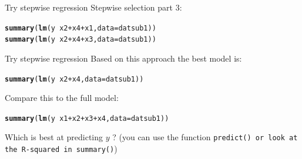 \documentclass[10pt]{beamer}\usepackage[]{graphicx}\usepackage[]{color}
\makeatletter
\newcommand{\hlopt}[1]{\textcolor[rgb]{0,0,0}{#1}}%
\newcommand{\hlstd}[1]{\textcolor[rgb]{0.345,0.345,0.345}{#1}}%
\newcommand{\hlkwc}[1]{\textcolor[rgb]{0.333,0.667,0.333}{#1}}%
\newcommand{\hlkwd}[1]{\textcolor[rgb]{0.737,0.353,0.396}{\textbf{#1}}}%
\newenvironment{kframe}{%
 \def\at@end@of@kframe{}%
 \ifinner\ifhmode%
  \def\at@end@of@kframe{\end{minipage}}%
  \begin{minipage}{\columnwidth}%
 \fi\fi%
 \def\FrameCommand##1{\hskip\@totalleftmargin \hskip-\fboxsep
 \colorbox{shadecolor}{##1}\hskip-\fboxsep
     \hskip-\linewidth \hskip-\@totalleftmargin \hskip\columnwidth}%
 \MakeFramed {\advance\hsize-\width
   \@totalleftmargin\z@ \linewidth\hsize
   \@setminipage}}%
 {\par\unskip\endMakeFramed%
 \at@end@of@kframe}
\newenvironment{knitrout}{}{} %
\makeatother
\begin{document}
\begin{frame}[fragile]{Try stepwise regression}
\pause
Stepwise selection part 3: \vspace{-0.1cm}
\begin{knitrout}\small
{}\color{fgcolor}\begin{kframe}
\begin{alltt}
\hlkwd{summary}\hlstd{(}\hlkwd{lm}\hlstd{(y} \hlopt{~} \hlstd{x2} \hlopt{+} \hlstd{x4} \hlopt{+} \hlstd{x1,} \hlkwc{data} \hlstd{= datsub1))}
\hlkwd{summary}\hlstd{(}\hlkwd{lm}\hlstd{(y} \hlopt{~} \hlstd{x2} \hlopt{+} \hlstd{x4} \hlopt{+} \hlstd{x3,} \hlkwc{data} \hlstd{= datsub1))}
\end{alltt}
\end{kframe}
\end{knitrout}


\end{frame}


\begin{frame}[fragile]{Try stepwise regression}
Based on this approach the best model is:
\begin{knitrout}\small
{}\color{fgcolor}\begin{kframe}
\begin{alltt}
\hlkwd{summary}\hlstd{(}\hlkwd{lm}\hlstd{(y} \hlopt{~} \hlstd{x2} \hlopt{+} \hlstd{x4,} \hlkwc{data} \hlstd{= datsub1))}
\end{alltt}
\end{kframe}
\end{knitrout}

Compare this to the full model:
\begin{knitrout}\small
{}\color{fgcolor}\begin{kframe}
\begin{alltt}
\hlkwd{summary}\hlstd{(}\hlkwd{lm}\hlstd{(y} \hlopt{~} \hlstd{x1} \hlopt{+} \hlstd{x2} \hlopt{+} \hlstd{x3} \hlopt{+} \hlstd{x4,} \hlkwc{data} \hlstd{= datsub1))}
\end{alltt}
\end{kframe}
\end{knitrout}

Which is best at predicting $y$ ? (you can use the function \texttt{predict() or look at the R-squared in summary()})

\end{frame}
\end{document}
